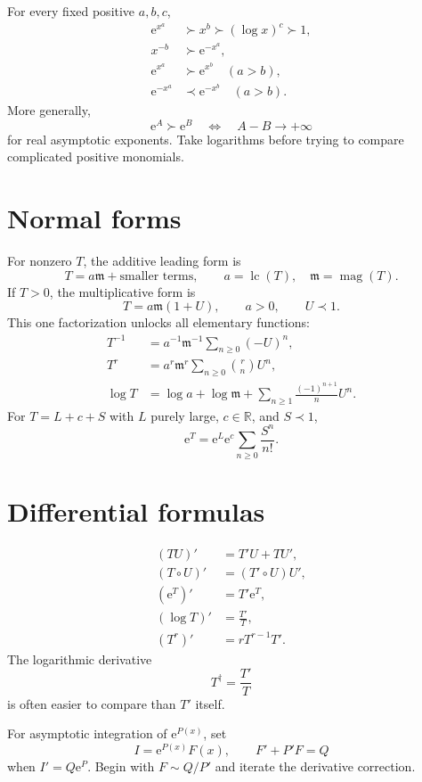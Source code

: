 \documentclass[11pt,oneside]{book}
\theoremstyle{definition}
\theoremstyle{remark}
\newcommand{\R}{\mathbb{R}}
\newcommand{\m}{\mathfrak{m}}
\newcommand{\magop}{\operatorname{mag}}
\newcommand{\lc}{\operatorname{lc}}
\newcommand{\e}{\mathrm{e}}
\newcommand{\precdom}{\prec}
\newcommand{\succdom}{\succ}
\newcommand{\compose}{\mathbin{\circ}}
\begin{document}
For every fixed positive $a,b,c$,
\begin{align*}
  \e^{x^a}&\succdom x^b\succdom(\log x)^c\succdom1,\\
  x^{-b}&\succdom\e^{-x^a},\\
  \e^{x^a}&\succdom\e^{x^b}\quad(a>b),\\
  \e^{-x^a}&\precdom\e^{-x^b}\quad(a>b).
\end{align*}
More generally,
\[
  \e^A\succdom\e^B
  \quad\Longleftrightarrow\quad A-B\to+\infty
\]
for real asymptotic exponents. Take logarithms before trying to compare
complicated positive monomials.

\section{Normal forms}

For nonzero $T$, the additive leading form is
\[
  T=a\m+\text{smaller terms},
  \qquad a=\lc(T),\quad\m=\magop(T).
\]
If $T>0$, the multiplicative form is
\[
  T=a\m(1+U),
  \qquad a>0,
  \qquad U\precdom1.
\]
This one factorization unlocks all elementary functions:
\begin{align*}
  T^{-1}&=a^{-1}\m^{-1}\sum_{n\ge0}(-U)^n,\\
  T^r&=a^r\m^r\sum_{n\ge0}\binom rnU^n,\\
  \log T&=\log a+\log\m+
     \sum_{n\ge1}\frac{(-1)^{n+1}}nU^n.
\end{align*}
For $T=L+c+S$ with $L$ purely large, $c\in\R$, and $S\precdom1$,
\[
  \e^T=\e^L\e^c\sum_{n\ge0}\frac{S^n}{n!}.
\]

\section{Differential formulas}

\begin{align*}
  (TU)'&=T'U+TU',\\
  (T\compose U)'&=(T'\compose U)U',\\
  (\e^T)'&=T'\e^T,\\
  (\log T)'&=\frac{T'}T,\\
  (T^r)'&=rT^{r-1}T'.
\end{align*}
The logarithmic derivative
\[
  T^\dagger=\frac{T'}T
\]
is often easier to compare than $T'$ itself.

For asymptotic integration of $\e^{P(x)}$, set
\[
  I=\e^{P(x)}F(x),
  \qquad F'+P'F=Q
\]
when $I'=Q\e^P$. Begin with $F\sim Q/P'$ and iterate the derivative correction.
\end{document}
